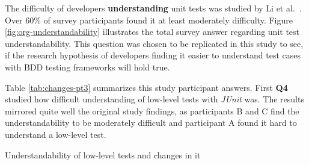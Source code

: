 The difficulty of developers \textbf{understanding} unit tests was studied by Li et al.~\cite{li2016automatically}. Over 60\% of survey
participants found it at least moderately difficulty. Figure \ref{fig:org-understandability} illustrates the total survey
answer regarding unit test understandability. This question was chosen to be replicated in this study to see, if the research
hypothesis of developers finding it easier to understand test cases with BDD testing frameworks will hold true.

Table \ref{tab:changes-pt3} summarizes this study participant answers. First \textbf{Q4} studied how difficult understanding
of low-level tests with \textit{JUnit} was. The results mirrored quite well the original study findings, as participants B and C
find the understandability to be moderately difficult and participant A found it hard to understand a low-level test.


    \begin{table}[H]
            \caption {Understandability of low-level tests and changes in it} \label{tab:changes-pt3}
    \end{table}

